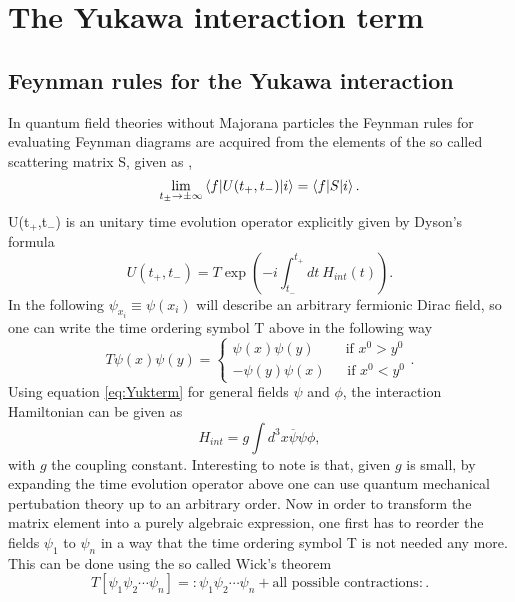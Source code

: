\appendix
\chapter{The Yukawa interaction term} \label{ap:yuk}
\section{Feynman rules for the Yukawa interaction}
\label{ap:feynman}
In quantum field theories without Majorana particles the Feynman rules for evaluating Feynman diagrams are acquired from the elements of the so called scattering matrix S, given as \cite[Eq. 3.26]{Tong:2006},
\begin{equation}
\lim\limits_{t_\pm\rightarrow\pm\infty}\braket{f|U(t_+,t_-)|i}=\braket{f|S|i}.
\label{eq:s-matrix}
\end{equation}
U(t$_+$,t$_-$) is an unitary time evolution operator explicitly given by Dyson's formula
\begin{equation*}
	U(t_+,t_-)=T\exp\left(-i\int_{t_-}^{t_+}dt\:H_{int}(t)\right).
\end{equation*}
In the following $\psi_{x_i}\equiv\psi(x_i)$ will describe an arbitrary fermionic Dirac field, so one can write the time ordering symbol T above in the following way
\begin{equation*}
	T\psi(x)\psi(y)=\left\{\begin{array}{c}\psi(x)\psi(y)\:\:\:\:\:\:\:\:\:\:\text{if } x^0>y^0\\-\psi(y)\psi(x)\:\:\:\:\:\:\:\text{if }x^0<y^0\end{array}\right. .
	\end{equation*}
Using equation \eqref{eq:Yukterm} for general fields $\psi$ and $\phi$, the interaction Hamiltonian can be given as
\begin{equation*}
	H_{int}=g\int d^3x \overline{\psi}\psi\phi,
\end{equation*}
with $g$ the coupling constant.\newline\indent
Interesting to note is that, given $g$ is small, by expanding the time evolution operator above one can use quantum mechanical pertubation theory up to an arbitrary order. \newline\indent
Now in order to transform the matrix element into a purely algebraic expression, one first has to reorder the fields $\psi_1$ to $\psi_n$ in a way that the time ordering symbol T is not needed any more. This can be done using the so called Wick's theorem
\begin{equation*}
	T\left[\psi_1\psi_2\cdots\psi_n\right]=:\psi_1\psi_2\cdots\psi_n+\text{all possible contractions}:.
\end{equation*}

